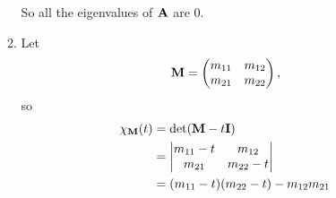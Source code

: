 \documentclass[fleqn,a4paper,11pt]{article}
\begin{document}
\begin{enumerate}[label=\textbf{\arabic*.}]
\begin{enumerate}[label=(\alph*)]
     So all the eigenvalues of \(\mathbf{A}\) are \(0\).
    \item
     Let
     \begin{equation*}
      \mathbf{M} = \begin{pmatrix}
       m_{11} & m_{12} \\
       m_{21} & m_{22}
      \end{pmatrix},
     \end{equation*}
     so
     \begin{align*}
      \chi_{\mathbf{M}}(t) &= \det(\mathbf{M} - t \mathbf{I}) \\
       &= \begin{vmatrix}
       m_{11} - t & m_{12} \\
       m_{21} & m_{22} - t
      \end{vmatrix} \\
       &= (m_{11} - t)(m_{22} - t) - m_{12} m_{21}
     \end{align*}
   \end{enumerate}
 \end{enumerate}
\end{document}
